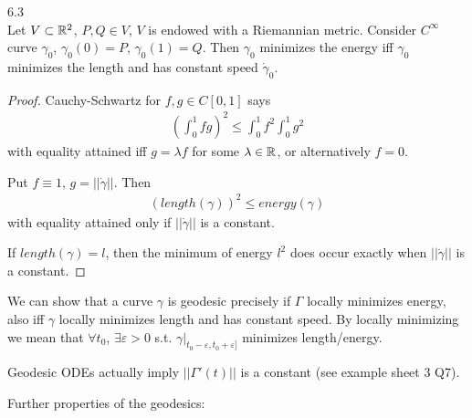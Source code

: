 \documentclass[a4paper]{article}
\begin{document}
\begin{lemma} 6.3\\
Let $V \subset \mathbb{R}^2$, $P,Q \in V$, $V$ is endowed with a Riemannian metric. Consider $C^\infty$ curve $\gamma_0$, $\gamma_0(0) = P$, $\gamma_0(1) = Q$. Then $\gamma_0$ minimizes the energy iff $\gamma_0$ minimizes the length and has constant speed $\dot{\gamma}_0$.
\begin{proof}
Cauchy-Schwartz for $f,g\in C[0,1]$ says
\begin{equation*}
\begin{aligned}
\left(\int_0^1 fg\right)^2 \leq \int_0^1 f^2\int_0^1 g^2
\end{aligned}
\end{equation*}
with equality attained iff $g=\lambda f$ for some $\lambda \in \mathbb{R}$, or alternatively $f=0$.

Put $f \equiv 1$, $g = ||\dot{\gamma}||$. Then
\begin{equation*}
\begin{aligned}
(length(\gamma))^2 \leq energy(\gamma)
\end{aligned}
\end{equation*}
with equality attained only if $||\dot{\gamma}||$ is a constant.

If $length(\gamma) = l$, then the minimum of energy $l^2$ does occur exactly when $||\dot{\gamma}||$ is a constant.
\end{proof}
\end{lemma}

\begin{rem}
We can show that a curve $\gamma$ is geodesic precisely if $\Gamma$ locally minimizes energy, also iff $\gamma$ locally minimizes length and has constant speed. By locally minimizing we mean that $\forall t_0$, $\exists \varepsilon > 0$ s.t. $\gamma|_{t_0-\varepsilon,t_0+\varepsilon]}$ minimizes length/energy.
\end{rem}

\begin{rem}
Geodesic ODEs actually imply $||\Gamma'(t)||$ is a constant (see example sheet 3 Q7).
\end{rem}

Further properties of the geodesics:
\end{document}
